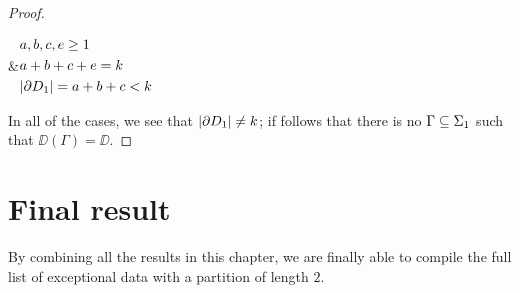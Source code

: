 \begin{proof}
\begin{enumerate}[(1)]
\begin{dessintext}
{
}&$\begin{aligned}
&a,b,c,e\ge 1\\
&a+b+c+e=k\\
&\lvert \partial D_1\rvert=a+b+c<k
\end{aligned}$
\end{dessintext}
\end{enumerate}

In all of the cases, we see that $\lvert \partial D_1\rvert\neq k$; if follows that there is no \dessin{} $\Gamma\subseteq\Sigma_{1}$ such that $\DD(\Gamma)=\DD$.
\end{proof}


\section{Final result}

By combining all the results in this chapter, we are finally able to compile the full list of exceptional data with a partition of length $2$.

